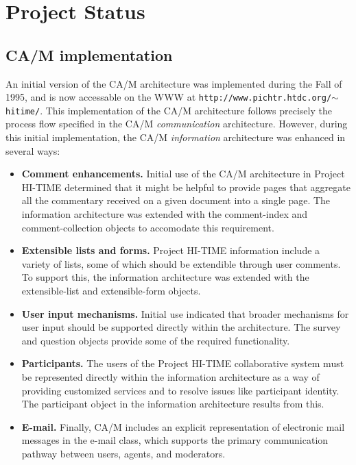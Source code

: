 \newpage
\section{Project Status}

\subsection{CA/M implementation}

An initial version of the CA/M architecture was implemented during the
Fall of 1995, and is now accessable on the WWW at 
{\tt http://www.pichtr.htdc.org/$\sim$hitime/}.  This implementation
of the CA/M architecture follows precisely the process flow specified
in the CA/M {\em communication} architecture.  However, during this 
initial implementation, the CA/M {\em information} architecture was 
enhanced in several ways:

\begin{itemize}

\item {\bf Comment enhancements.}  Initial use of the CA/M architecture in
  Project HI-TIME determined that it might be helpful to provide pages that
  aggregate all the commentary received on a given document into a single
  page. The information architecture was extended with the comment-index and 
  comment-collection objects to accomodate this requirement.

\item {\bf Extensible lists and forms.}  Project HI-TIME information
  include a variety of lists, some of which should be extendible through user
  comments. To support this, the information architecture was extended with
  the extensible-list and extensible-form objects.

\item {\bf User input mechanisms.}  Initial use indicated that broader
  mechanisms for user input should be supported directly within the
  architecture.  The survey and question objects provide some of the required
  functionality.

\item {\bf Participants.}  The users of the Project HI-TIME collaborative
  system must be represented directly within the information architecture
  as a way of providing customized services and to resolve issues like
  participant identity.  The participant object in the information
  architecture results from this.

\item {\bf E-mail.} Finally, CA/M includes an explicit representation of
  electronic mail messages in the e-mail class, which supports the
  primary communication pathway between users, agents, and moderators.

\end{itemize}

